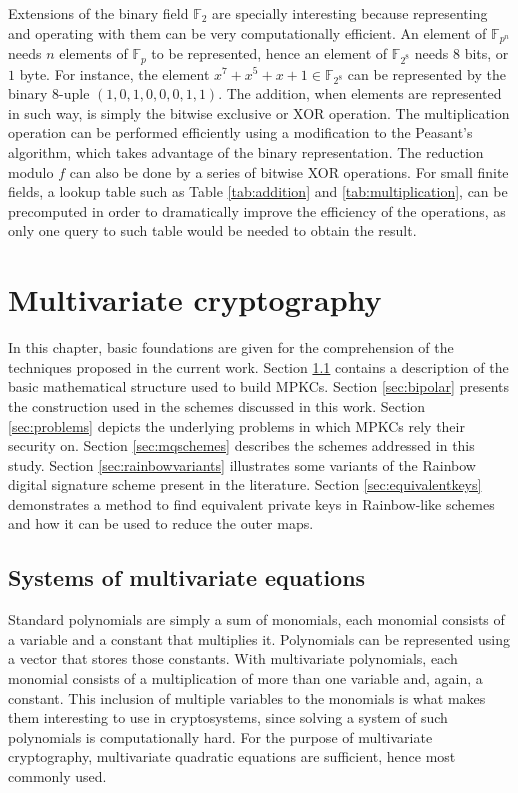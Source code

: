 \documentclass{ufsctex/ufsctex}
\begin{document}
Extensions of the binary field $\mathbb{F}_2$ are specially interesting because
representing and operating with them can be very computationally efficient. An
element of $\mathbb{F}_{p^n}$ needs $n$ elements of $\mathbb{F}_p$ to be
represented, hence an element of $\mathbb{F}_{2^8}$ needs $8$ bits, or $1$
byte. For instance, the element $x^7 + x^5 + x + 1 \in \mathbb{F}_{2^8}$ can be
represented by the binary $8$-uple $(1, 0, 1, 0, 0, 0, 1, 1)$. The addition,
when elements are represented in such way, is simply the bitwise exclusive or
XOR operation. The multiplication operation can be performed efficiently using
a modification to the Peasant's algorithm, which takes advantage of the binary
representation. The reduction modulo $f$ can also be done by a series of
bitwise XOR operations. For small finite fields, a lookup table such as Table
\ref{tab:addition} and \ref{tab:multiplication}, can be precomputed in order to
dramatically improve the efficiency of the operations, as only one query to
such table would be needed to obtain the result.

\chapter{Multivariate cryptography}

In this chapter, basic foundations are given for the comprehension of the
techniques proposed in the current work. Section \ref{sec:mqsystems} contains a
description of the basic mathematical structure used to build MPKCs. Section
\ref{sec:bipolar} presents the construction used in the schemes discussed in
this work. Section \ref{sec:problems} depicts the underlying problems in which
MPKCs rely their security on. Section \ref{sec:mqschemes} describes the schemes
addressed in this study. Section \ref{sec:rainbowvariants} illustrates some
variants of the Rainbow digital signature scheme present in the literature.
Section \ref{sec:equivalentkeys} demonstrates a method to find equivalent
private keys in Rainbow-like schemes and how it can be used to reduce the outer
maps.

\section{Systems of multivariate equations}\label{sec:mqsystems}

Standard polynomials are simply a sum of monomials, each monomial consists of a
variable and a constant that multiplies it. Polynomials can be represented
using a vector that stores those constants. With multivariate polynomials, each
monomial consists of a multiplication of more than one variable and, again, a
constant. This inclusion of multiple variables to the monomials is what makes
them interesting to use in cryptosystems, since solving a system of such
polynomials is computationally hard. For the purpose of multivariate
cryptography, multivariate quadratic equations are sufficient, hence most
commonly used.
\end{document}
